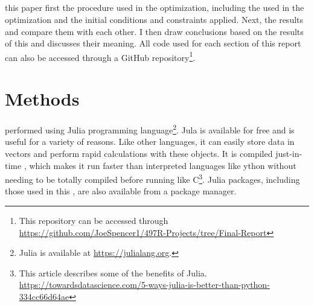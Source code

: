 \documentclass[journal ]{new-aiaa}
\begin{document}
\subsection{}

this paper  first   the procedure used in the   optimization, including the   used in the optimization and the initial conditions and constraints applied. Next,   the results and compare them with each other.   I then draw conclusions based on the results of this   and discusses their meaning.  All code used for each section of this report can also be accessed through a GitHub repository\footnote{This repository can be accessed through \url{https://github.com/JoeSpencer1/497R-Projects/tree/Final-Report}}.


\section{Methods }

  performed  using Julia programming language\footnote{Julia is available at \url{https://julialang.org}.}. Jula is available for free and is useful for a variety of reasons. Like other languages, it can easily store data in vectors and perform rapid calculations with these objects. It is compiled just-in-time  , which makes it run faster than interpreted languages like ython without needing to be totally compiled before running  like C\footnote{This article describes some of the benefits of Julia. \url{https://towardsdatascience.com/5-ways-julia-is-better-than-python-334cc66d64ae}}.  Julia  packages, including those used in  this  , are also   available from a package manager.
\end{document}
